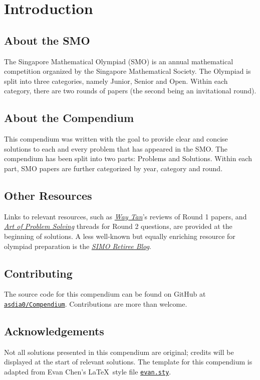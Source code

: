 \chapter{Introduction}

\section*{About the SMO}
The Singapore Mathematical Olympiad (SMO) is an annual mathematical competition organized by the Singapore Mathematical Society. The Olympiad is split into three categories, namely Junior, Senior and Open. Within each category, there are two rounds of papers (the second being an invitational round).

\section*{About the Compendium}

This compendium was written with the goal to provide clear and concise solutions to each and every problem that has appeared in the SMO. The compendium has been split into two parts: Problems and Solutions. Within each part, SMO papers are further categorized by year, category and round.

\section*{Other Resources}
Links to relevant resources, such as \href{https://www.youtube.com/c/WayTan}{\textit{Way Tan}}'s reviews of Round 1 papers, and \href{https://artofproblemsolving.com/}{\textit{Art of Problem Solving}} threads for Round 2 questions, are provided at the beginning of solutions. A less well-known but equally enriching resource for olympiad preparation is the \href{https://simoxmenblog.blogspot.com/}{\textit{SIMO Retiree Blog}}.

\section*{Contributing}

The source code for this compendium can be found on GitHub at \href{https://github.com/asdia0/Compendium}{\texttt{asdia0/Compendium}}. Contributions are more than welcome.

\section*{Acknowledgements}

Not all solutions presented in this compendium are original; credits will be displayed at the start of relevant solutions. The template for this compendium is adapted from Evan Chen's  \LaTeX\ style file \href{https://github.com/vEnhance/dotfiles/blob/main/texmf/tex/latex/evan/evan.sty}{\texttt{evan.sty}}.
